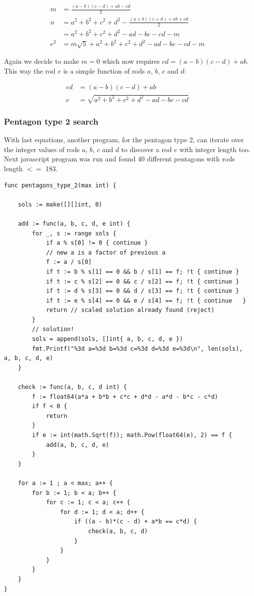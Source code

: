 \documentclass[11pt]{article}
\begin{document}
\begin{align*}
m   &= \frac{(a - b)(c - d) + ab - cd}{2} \\
n   &= a^2 + b^2 + c^2 + d^2 - \frac{(a + b)(c + d) + ab + cd}{2} \\
    &=  a^2 + b^2 + c^2 + d^2 - ad - bc - cd - m \\
e^2 &= m\sqrt{5} + a^2 + b^2 + c^2 + d^2 - ad - bc - cd - m
\end{align*}

Again we decide to make $m = 0$ which now requires $cd = (a-b)(c-d)+ab$.
This way the rod $e$ is a simple function of rods $a$, $b$, $c$ and $d$:

\begin{align*}
cd &= (a - b)(c - d ) + ab \\
e &= \sqrt{a^2 + b^2 + c^2 + d^2 - ad - bc - cd}
\end{align*}

\subsubsection{Pentagon type 2 search}

With last equations, another program, for the pentagon type 2, can iterate over the integer values of rods $a$, $b$, $c$ and $d$ to discover a rod $e$ with integer length too. Next javascript program was run and found 40 different pentagons with rods length $<=$ 183.

\begin{lstlisting}
func pentagons_type_2(max int) {

	sols := make([][]int, 0)

	add := func(a, b, c, d, e int) {
		for _, s := range sols {
			if a % s[0] != 0 { continue }
			// new a is a factor of previous a
			f := a / s[0]
			if t := b % s[1] == 0 && b / s[1] == f; !t { continue }
			if t := c % s[2] == 0 && c / s[2] == f; !t { continue }
			if t := d % s[3] == 0 && d / s[3] == f; !t { continue }
			if t := e % s[4] == 0 && e / s[4] == f; !t { continue	}
			return // scaled solution already found (reject)
		}
		// solution!
		sols = append(sols, []int{ a, b, c, d, e })
		fmt.Printf("%3d a=%3d b=%3d c=%3d d=%3d e=%3d\n", len(sols), a, b, c, d, e)
	}

	check := func(a, b, c, d int) {
		f := float64(a*a + b*b + c*c + d*d - a*d - b*c - c*d)
	    if f < 0 {
	    	return
	    }
		if e := int(math.Sqrt(f)); math.Pow(float64(e), 2) == f {
			add(a, b, c, d, e)
		}
	}

    for a := 1 ; a < max; a++ {
    	for b := 1; b < a; b++ {
        	for c := 1; c < a; c++ {
          		for d := 1; d < a; d++ {
            		if ((a - b)*(c - d) + a*b == c*d) {
              			check(a, b, c, d)
              		}
              	}
            }
        }
    }
}
\end{lstlisting}
\end{document}
